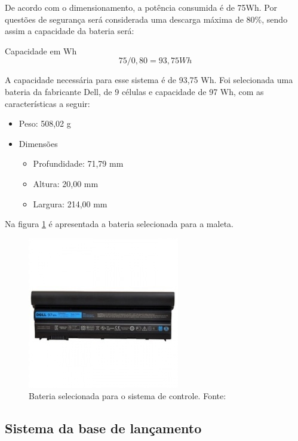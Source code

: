 \par De acordo com o dimensionamento, a potência consumida é de 75Wh. Por questões de segurança será considerada uma descarga máxima de 80\%, sendo assim a capacidade da bateria será:

Capacidade em Wh
\begin{equation}
    75/0,80 = 93,75 Wh
\end{equation}

\par A capacidade necessária para esse sistema é de 93,75 Wh. Foi selecionada uma bateria da fabricante Dell, de 9 células e capacidade de 97 Wh, com as características a seguir:

\begin{itemize}
    \item Peso: 508,02 g
    \item Dimensões
    \begin{itemize}
        \item Profundidade: 71,79 mm 
        \item Altura: 20,00 mm 
        \item Largura: 214,00 mm  
    \end{itemize}
\end{itemize}


\par Na figura \ref{fig:bateriamaleta} é apresentada a bateria selecionada para a maleta.

\begin{figure}[!h]
	\centering
		\includegraphics[keepaspectratio=true,scale=1]{figuras/bateria_maleta.jpg}
	\caption{Bateria selecionada para o sistema de controle. Fonte: \cite{figura_bateria_maleta}} 
	\label{fig:bateriamaleta}
	\end{figure}

\subsection{Sistema da base de lançamento} 

